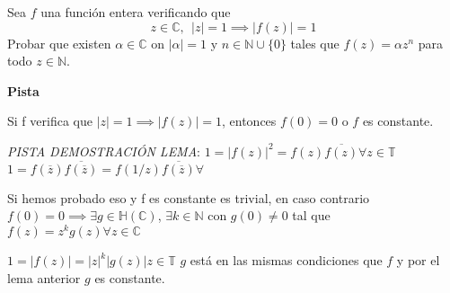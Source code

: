 \begin{ejer}
	Sea $f$ una función entera verificando que
	$$ z\in\mathbb{C}, \ \ |z|=1 \implies |f(z)|=1 $$
	Probar que existen $\alpha\in\mathbb{C}$ on $|\alpha|=1$ y $n\in\mathbb{N}\cup \{0\}$ tales que $f(z) = \alpha z^n$ para todo $z\in\mathbb{N}$.
\end{ejer}
\begin{sol}

\textbf{Pista}

\begin{lema}
	
Si f verifica que $|z|=1 \implies |f(z)|=1$, entonces $f(0)=0$ o $f$ es constante.

\textit{PISTA DEMOSTRACIÓN LEMA}:
$1=|f(z)|^2 = f(z)\overline{f(z)} \forall z\in\mathbb{T}$ 
$1= f(\overline{z})\overline{f(\overline{z})} = f(1/z)\overline{f(\overline{z})}\forall $ 
\end{lema}


Si hemos probado eso y f es constante es trivial, en caso contrario
$f(0)=0 \implies \exists g\in\mathbb{H}(\mathbb{C})$, $\exists k\in\mathbb{N}$ con $g(0) \not =0$ tal que
$f(z) = z^kg(z) \forall z\in\mathbb{C}$

$1=|f(z)| = |z|^k|g(z)| z\in\mathbb{T}$
$g$ está en las mismas condiciones que $f$ y por el lema anterior $g$ es constante.
\end{sol}